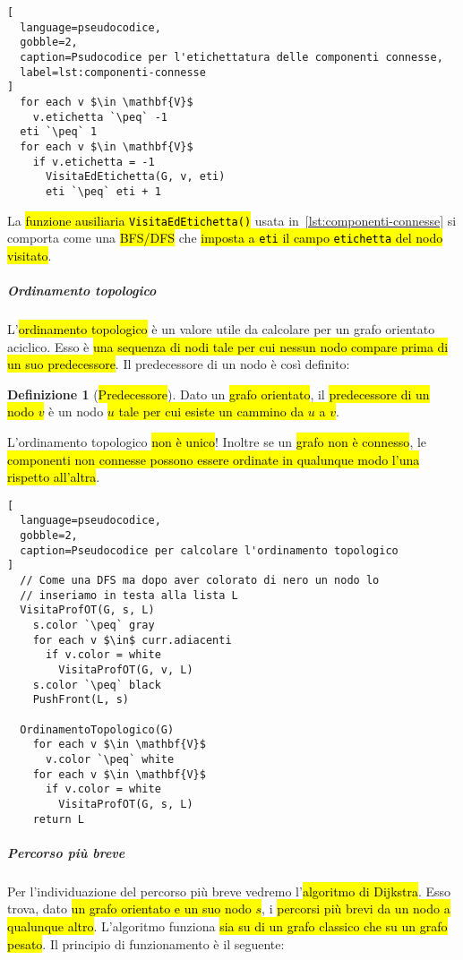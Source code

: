 \documentclass[a4paper,11pt,oneside]{article}
\theoremstyle{plain}
\theoremstyle{definition}
\newtheorem{defn}{Definizione}[section]
\theoremstyle{remark}
\newcommand{\peq}{$\gets$}
\begin{document}
\begin{lstlisting}[
  language=pseudocodice,
  gobble=2,
  caption=Psudocodice per l'etichettatura delle componenti connesse,
  label=lst:componenti-connesse
]
  for each v $\in \mathbf{V}$
    v.etichetta `\peq` -1
  eti `\peq` 1
  for each v $\in \mathbf{V}$
    if v.etichetta = -1
      VisitaEdEtichetta(G, v, eti)
      eti `\peq` eti + 1
\end{lstlisting}

\noindent La \hl{funzione ausiliaria \texttt{VisitaEdEtichetta()}} usata
in~\ref{lst:componenti-connesse} si comporta come una \hl{BFS/DFS} che
\hl{imposta a \texttt{eti} il campo \texttt{etichetta} del nodo visitato}.

\subparagraph{Ordinamento topologico} L'\hl{ordinamento topologico} è un valore
utile da calcolare per un grafo orientato aciclico. Esso è \hl{una sequenza di
nodi tale per cui nessun nodo compare prima di un suo predecessore}. Il
predecessore di un nodo è così definito:

\begin{defn}[\hl{Predecessore}]\label{def:graph-predecessor}
  Dato un \hl{grafo orientato}, il \hl{predecessore di un nodo $v$} è un nodo
  \hl{$u$ tale per cui esiste un cammino da $u$ a $v$}.
\end{defn}

\noindent L'ordinamento topologico \hl{non è unico}! Inoltre se un \hl{grafo non
è connesso}, le \hl{componenti non connesse possono essere ordinate in qualunque
modo l'una rispetto all'altra}.

\begin{lstlisting}[
  language=pseudocodice,
  gobble=2,
  caption=Pseudocodice per calcolare l'ordinamento topologico
]
  // Come una DFS ma dopo aver colorato di nero un nodo lo
  // inseriamo in testa alla lista L
  VisitaProfOT(G, s, L)
    s.color `\peq` gray
    for each v $\in$ curr.adiacenti
      if v.color = white
        VisitaProfOT(G, v, L)
    s.color `\peq` black
    PushFront(L, s)

  OrdinamentoTopologico(G)
    for each v $\in \mathbf{V}$
      v.color `\peq` white
    for each v $\in \mathbf{V}$
      if v.color = white
        VisitaProfOT(G, s, L)
    return L
\end{lstlisting}

\subparagraph{Percorso più breve} Per l'individuazione del percorso più breve
vedremo l'\hl{algoritmo di Dijkstra}. Esso trova, dato \hl{un grafo orientato e
un suo nodo $s$}, i \hl{percorsi più brevi da un nodo a qualunque altro}.
L'algoritmo funziona \hl{sia su di un grafo classico che su un grafo pesato}. Il
principio di funzionamento è il seguente:
\end{document}
